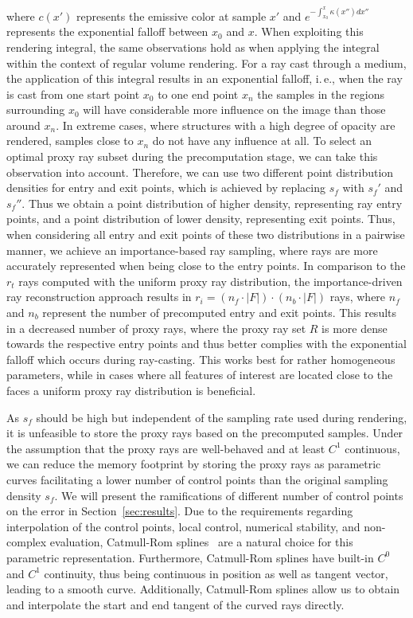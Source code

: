 \documentclass[journal]{vgtc}                %
\begin{document}
\noindent where $c(x')$ represents the emissive color at sample $x'$ and $e^{-\int_{x_0}^{x}\kappa(x'')dx''}$ represents the exponential falloff between $x_0$ and $x$. When exploiting this rendering integral, the same observations hold as when applying the integral within the context of regular volume rendering. For a ray cast through a medium, the application of this integral results in an exponential falloff, i.\,e., when the ray is cast from one start point $x_0$ to one end point $x_n$ the samples in the regions surrounding $x_0$ will have considerable more influence on the image than those around $x_n$. In extreme cases, where structures with a high degree of opacity are rendered, samples close to $x_n$ do not have any influence at all. To select an optimal proxy ray subset during the precomputation stage, we can take this observation into account. Therefore, we can use two different point distribution densities for entry and exit points, which is achieved by replacing $s_f$ with $s_f'$ and $s_f''$. Thus we obtain a point distribution of higher density, representing ray entry points, and a point distribution of lower density, representing exit points. Thus, when considering all entry and exit points of these two distributions in a pairwise manner, we achieve an importance-based ray sampling, where rays are more accurately represented when being close to the entry points. In comparison to the $r_t$ rays computed with the uniform proxy ray distribution, the importance-driven ray reconstruction approach results in $r_i = (n_f \cdot \left|F\right|) \cdot (n_b \cdot \left|F\right|)$ rays, where $n_f$ and $n_b$ represent the number of precomputed entry and exit points. This results in a decreased number of proxy rays, where the proxy ray set $R$ is more dense towards the respective entry points and thus better complies with the exponential falloff which occurs during ray-casting. This works best for rather homogeneous parameters, while in cases where all features of interest are located close to the faces a uniform proxy ray distribution is beneficial.

As $s_f$ should be high but independent of the sampling rate used during rendering, it is unfeasible to store the proxy rays based on the precomputed samples. Under the assumption that the proxy rays are well-behaved and at least $C^1$ continuous, we can reduce the memory footprint by storing the proxy rays as parametric curves facilitating a lower number of control points than the original sampling density $s_f$. We will present the ramifications of different number of control points on the error in Section~\ref{sec:results}. Due to the requirements regarding interpolation of the control points, local control, numerical stability, and non-complex evaluation, Catmull-Rom splines~\cite{catmull74splines} are a natural choice for this parametric representation. Furthermore, Catmull-Rom splines have built-in $C^{0}$ and $C^{1}$ continuity, thus being continuous in position as well as tangent vector, leading to a smooth curve. Additionally, Catmull-Rom splines allow us to obtain and interpolate the start and end tangent of the curved rays directly.
%
%
%
\end{document}
